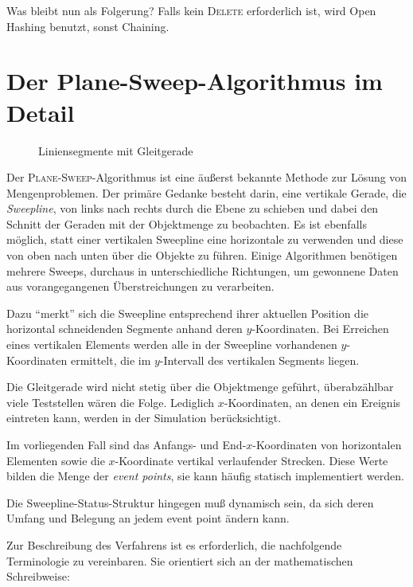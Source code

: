 \documentclass[ngerman,draft,parskip=half*,twoside]{scrreprt}
\theoremstyle{break}
\begin{document}
Was bleibt nun als Folgerung? Falls kein \textsc{Delete} erforderlich ist, wird Open Hashing benutzt, sonst Chaining.

\appendix    %

\chapter{Der Plane-Sweep-Algorithmus im Detail}
\label{planesweep}

\begin{figure}
  \centering  
  \caption{Liniensegmente mit Gleitgerade}
  \label{131003d}
\end{figure}

Der \textsc{Plane-Sweep}-Algorithmus ist eine äußerst bekannte
Methode zur Lösung von Mengenproblemen. Der primäre Gedanke
besteht darin, eine vertikale Gerade, die \textit{Sweepline}, von
links nach rechts durch die Ebene zu schieben und dabei den
Schnitt der Geraden mit der Objektmenge zu beobachten. Es
ist ebenfalls möglich, statt einer vertikalen Sweepline eine
horizontale zu verwenden und diese von oben nach unten über die
Objekte zu führen. Einige Algorithmen benötigen mehrere Sweeps,
durchaus in unterschiedliche Richtungen, um gewonnene Daten aus
vorangegangenen Überstreichungen zu verarbeiten.

Dazu "`merkt"' sich die Sweepline entsprechend ihrer aktuellen
Position die horizontal schneidenden Segmente anhand deren
$y$-Koordinaten. Bei Erreichen eines vertikalen Elements
werden alle in der Sweepline vorhandenen $y$-Koordinaten
ermittelt, die im $y$-Intervall des vertikalen Segments
liegen.

Die Gleitgerade wird nicht stetig über die Objektmenge
geführt, überabzählbar viele Teststellen wären die Folge. 
Lediglich $x$-Koordinaten, an denen ein Ereignis
eintreten kann, werden in der Simulation berücksichtigt.

Im vorliegenden Fall sind das Anfangs- und End-$x$-Koordinaten von
horizontalen Elementen sowie die $x$-Koordinate 
vertikal verlaufender Strecken. Diese Werte bilden die Menge
der \textit{event points}, sie kann häufig statisch implementiert werden.

Die Sweepline-Status-Struktur hingegen muß dynamisch sein, da sich
deren Umfang und Belegung an jedem event point ändern kann.

Zur Beschreibung des Verfahrens ist es erforderlich, die nachfolgende
Terminologie zu vereinbaren. Sie orientiert sich an der mathematischen
Schreibweise:
\end{document}

